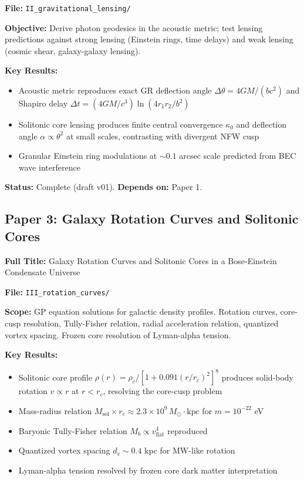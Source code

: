 \documentclass[11pt,a4paper]{article}
\begin{document}
\textbf{File:} \texttt{II\_gravitational\_lensing/}

\textbf{Objective:} Derive photon geodesics in the acoustic metric; test lensing predictions against strong lensing (Einstein rings, time delays) and weak lensing (cosmic shear, galaxy-galaxy lensing).

\textbf{Key Results:}
\begin{itemize}[leftmargin=*, itemsep=0.1em]
\item Acoustic metric reproduces exact GR deflection angle $\Delta\theta = 4GM/(bc^2)$ and Shapiro delay $\Delta t = (4GM/c^3)\ln(4r_1 r_2/b^2)$
\item Solitonic core lensing produces finite central convergence $\kappa_0$ and deflection angle $\alpha \propto \theta^2$ at small scales, contrasting with divergent NFW cusp
\item Granular Einstein ring modulations at $\sim 0.1$ arcsec scale predicted from BEC wave interference
\end{itemize}

\textbf{Status:} Complete (draft v01). \quad \textbf{Depends on:} Paper 1.

\subsection{Paper 3: Galaxy Rotation Curves and Solitonic Cores}
\label{sec:paper3}

\textbf{Full Title:} Galaxy Rotation Curves and Solitonic Cores in a Bose-Einstein Condensate Universe

\textbf{File:} \texttt{III\_rotation\_curves/}

\textbf{Scope:} GP equation solutions for galactic density profiles. Rotation curves, core-cusp resolution, Tully-Fisher relation, radial acceleration relation, quantized vortex spacing. Frozen core resolution of Lyman-alpha tension.

\textbf{Key Results:}
\begin{itemize}[leftmargin=*, itemsep=0.1em]
\item Solitonic core profile $\rho(r) = \rho_c/[1+0.091(r/r_c)^2]^8$ produces solid-body rotation $v \propto r$ at $r < r_c$, resolving the core-cusp problem
\item Mass-radius relation $M_{\mathrm{sol}} \times r_c \approx 2.3 \times 10^9\,M_\odot \cdot \mathrm{kpc}$ for $m = 10^{-22}$ eV
\item Baryonic Tully-Fisher relation $M_b \propto v_{\mathrm{flat}}^4$ reproduced
\item Quantized vortex spacing $d_v \sim 0.4$ kpc for MW-like rotation
\item Lyman-alpha tension resolved by frozen core dark matter interpretation
\end{itemize}
\end{document}
